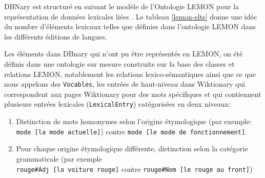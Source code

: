 \documentclass[10pt,a4paper,twoside]{article}
\begin{document}
DBNary est structuré en suivant le modèle de l'Ontologie LEMON pour la représentation de données lexicales liées \cite{DBLP:conf/esws/McCraeSC11}. Le tableau \ref{lemon-elts} donne une idée du nombre d'éléments lexicaux telles que définies dans l'ontologie LEMON dans les différents éditions de langues.

Les éléments dans DBnary qui n'ont pu être représentés en LEMON, on été définis dans une ontologie sur mesure construite sur la base des classes et relations LEMON, notablement les relations lexico-sémantiques ainsi que ce que nous appelons des \verb|Vocables|, les entrées de haut-niveau dans Wiktionary qui correspondent aux pages Wiktionary pour des mots spécifiques et qui contiennent plusieurs entrées lexicales (\verb|LexicalEntry|) catégorisées en deux niveaux:
\begin{enumerate}
	\item Distinction de mots homonymes selon l'origine étymologique (par exemple: \verb|mode [la mode actuelle]|) contre \verb|mode [le mode de fonctionnement]|.
	\item Pour chaque origine étymologique différente, distinction selon la catégorie grammaticale (par exemple \\ \verb|rouge#Adj [la voiture rouge]| contre \verb|rouge#Nom [le rouge au front]|)
\end{enumerate}
\end{document}
